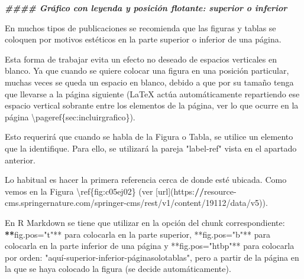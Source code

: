 \documentclass[11pt,a4paper,oneside,]{article}
\newenvironment{Shaded}{\begin{snugshade}}{\end{snugshade}}
\newcommand{\AttributeTok}[1]{\textcolor[rgb]{0.77,0.63,0.00}{#1}}
\newcommand{\DecValTok}[1]{\textcolor[rgb]{0.00,0.00,0.81}{#1}}
\newcommand{\DocumentationTok}[1]{\textcolor[rgb]{0.56,0.35,0.01}{\textbf{\textit{#1}}}}
\newcommand{\ErrorTok}[1]{\textcolor[rgb]{0.64,0.00,0.00}{\textbf{#1}}}
\newcommand{\FunctionTok}[1]{\textcolor[rgb]{0.00,0.00,0.00}{#1}}
\newcommand{\NormalTok}[1]{#1}
\newcommand{\SpecialCharTok}[1]{\textcolor[rgb]{0.00,0.00,0.00}{#1}}
\newcommand{\StringTok}[1]{\textcolor[rgb]{0.31,0.60,0.02}{#1}}
\numberwithin{dummy}{section}
\theoremstyle{ocrenumbox}
\theoremstyle{blacknumex}
\theoremstyle{blacknumbox}
\theoremstyle{ocrenum}
\theoremstyle{ocrenum}
\begin{document}
\begin{Shaded}
\begin{Highlighting}[numbers=left,,]
\DocumentationTok{\#\#\#\# Gráfico con leyenda y posición flotante: superior o inferior}

\NormalTok{En muchos tipos de publicaciones se recomienda que las figuras y tablas se coloquen por motivos estéticos en la parte superior o inferior de una página. }

\NormalTok{Esta forma de trabajar evita un efecto no deseado de espacios verticales en blanco. Ya que cuando se quiere colocar una figura en una posición particular, muchas veces se queda un espacio en blanco, debido a que por su tamaño tenga que llevarse a la página }\FunctionTok{siguiente}\NormalTok{ (LaTeX actúa automáticamente repartiendo ese espacio vertical sobrante entre los elementos de la página, ver lo que ocurre en la página \textbackslash{}pageref\{sec}\SpecialCharTok{:}\NormalTok{incluirgrafico\}).}

\NormalTok{Esto requerirá que cuando se habla de la Figura o Tabla, se utilice un elemento que la identifique. Para ello, se utilizará la pareja }\StringTok{"label{-}ref"}\NormalTok{ vista en el apartado anterior.}

\NormalTok{Lo habitual es hacer la primera referencia cerca de donde esté ubicada. Como vemos en la Figura \textbackslash{}ref\{fig}\SpecialCharTok{:}\NormalTok{c05ej02\} (ver [url](https}\SpecialCharTok{:}\ErrorTok{//}\NormalTok{resource}\SpecialCharTok{{-}}\NormalTok{cms.springernature.com}\SpecialCharTok{/}\NormalTok{springer}\SpecialCharTok{{-}}\NormalTok{cms}\SpecialCharTok{/}\NormalTok{rest}\SpecialCharTok{/}\NormalTok{v1}\SpecialCharTok{/}\NormalTok{content}\SpecialCharTok{/}\DecValTok{19112}\SpecialCharTok{/}\NormalTok{data}\SpecialCharTok{/}\NormalTok{v5)).}

\NormalTok{En R Markdown se tiene que utilizar en la opción del chunk correspondiente}\SpecialCharTok{:} \ErrorTok{**}\StringTok{\textasciigrave{}}\AttributeTok{fig.pos="t"}\StringTok{\textasciigrave{}}\SpecialCharTok{**}\NormalTok{  para colocarla en la parte superior, }\SpecialCharTok{**}\StringTok{\textasciigrave{}}\AttributeTok{fig.pos="b"}\StringTok{\textasciigrave{}}\SpecialCharTok{**}\NormalTok{  para colocarla en la parte inferior de una página y }\SpecialCharTok{**}\StringTok{\textasciigrave{}}\AttributeTok{fig.pos="htbp"}\StringTok{\textasciigrave{}}\SpecialCharTok{**}\NormalTok{ para colocarla por orden}\SpecialCharTok{:} \StringTok{"aquí{-}superior{-}inferior{-}páginasolotablas"}\NormalTok{, pero a partir de la página en la que se haya colocado la }\FunctionTok{figura}\NormalTok{ (se decide automáticamente).}


\end{Highlighting}
\end{Shaded}
\end{document}

